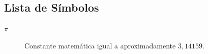\begin{frontmatter}
	\chapter*{Lista de Símbolos}
\end{frontmatter}

\begin{description}
	\item[$\pi$] Constante matemática igual a aproximadamente $3{,}14159$.
\end{description}

